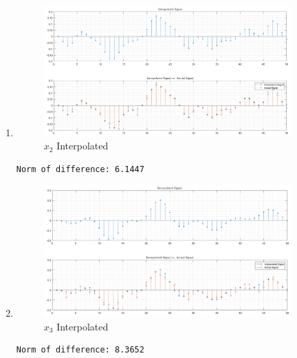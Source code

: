 \documentclass{article}[a4paper]
\begin{document}
	\begin{enumerate}[label=(\alph*)]
		\item \phantom{a}
		\begin{figure}[H]
			\centering
			\includegraphics[width=0.9\textwidth]{images/q2_x2_interp.png}
			\caption{$x_2$ Interpolated}
			\label{x2_interp}
		\end{figure}
		
		\begin{lstlisting}[caption={Code output}, label=x2_x_norm]
Norm of difference: 6.1447
		\end{lstlisting}
		
		\item \phantom{a}
		\begin{figure}[H]
			\centering
			\includegraphics[width=0.9\textwidth]{images/q2_x3_interp.png}
			\caption{$x_3$ Interpolated}
			\label{x3_interp}
		\end{figure}
		
		\begin{lstlisting}[caption={Code output}, label=x3_x_norm]
Norm of difference: 8.3652
		\end{lstlisting}
		

\end{enumerate}
\end{document}
